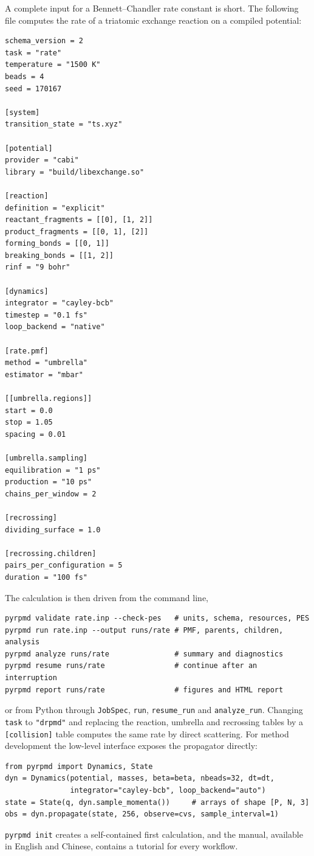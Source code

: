 \documentclass[preprint,12pt]{elsarticle}
\newcommand{\code}[1]{\texttt{#1}}
\begin{document}
A complete input for a Bennett--Chandler rate constant is short. The following file computes the rate of a triatomic exchange reaction on a compiled potential:
\begin{lstlisting}
schema_version = 2
task = "rate"
temperature = "1500 K"
beads = 4
seed = 170167

[system]
transition_state = "ts.xyz"

[potential]
provider = "cabi"
library = "build/libexchange.so"

[reaction]
definition = "explicit"
reactant_fragments = [[0], [1, 2]]
product_fragments = [[0, 1], [2]]
forming_bonds = [[0, 1]]
breaking_bonds = [[1, 2]]
rinf = "9 bohr"

[dynamics]
integrator = "cayley-bcb"
timestep = "0.1 fs"
loop_backend = "native"

[rate.pmf]
method = "umbrella"
estimator = "mbar"

[[umbrella.regions]]
start = 0.0
stop = 1.05
spacing = 0.01

[umbrella.sampling]
equilibration = "1 ps"
production = "10 ps"
chains_per_window = 2

[recrossing]
dividing_surface = 1.0

[recrossing.children]
pairs_per_configuration = 5
duration = "100 fs"
\end{lstlisting}
The calculation is then driven from the command line,
\begin{lstlisting}
pyrpmd validate rate.inp --check-pes   # units, schema, resources, PES
pyrpmd run rate.inp --output runs/rate # PMF, parents, children, analysis
pyrpmd analyze runs/rate               # summary and diagnostics
pyrpmd resume runs/rate                # continue after an interruption
pyrpmd report runs/rate                # figures and HTML report
\end{lstlisting}
or from Python through \code{JobSpec}, \code{run}, \code{resume\_run} and \code{analyze\_run}. Changing \code{task} to \code{"drpmd"} and replacing the reaction, umbrella and recrossing tables by a \code{[collision]} table computes the same rate by direct scattering. For method development the low-level interface exposes the propagator directly:
\begin{lstlisting}
from pyrpmd import Dynamics, State
dyn = Dynamics(potential, masses, beta=beta, nbeads=32, dt=dt,
               integrator="cayley-bcb", loop_backend="auto")
state = State(q, dyn.sample_momenta())     # arrays of shape [P, N, 3]
obs = dyn.propagate(state, 256, observe=cvs, sample_interval=1)
\end{lstlisting}
\code{pyrpmd init} creates a self-contained first calculation, and the manual, available in English and Chinese, contains a tutorial for every workflow.
\end{document}
